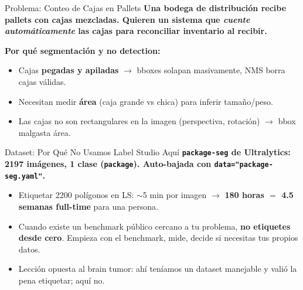 \documentclass[aspectratio=169, 11pt]{beamer}
\begin{document}
\begin{frame}[shrink]{Problema: Conteo de Cajas en Pallets}
  \vspace{6pt}
  {\footnotesize\color{arcaDark}\bfseries
    Una bodega de distribuci\'on recibe pallets con cajas mezcladas.
    Quieren un sistema que \emph{cuente autom\'aticamente} las cajas
    para reconciliar inventario al recibir.}

  \vspace{12pt}
  {\footnotesize\color{arcaDark}\bfseries Por qu\'e segmentaci\'on y no detection:}

  \vspace{8pt}
  {\footnotesize
  \begin{itemize}\setlength{\itemsep}{5pt}
    \item[{\color{arcaRed}\scriptsize\faArrowRight}]
      Cajas \textbf{pegadas y apiladas} $\to$ bboxes solapan masivamente,
      NMS borra cajas v\'alidas.
    \item[{\color{arcaRed}\scriptsize\faArrowRight}]
      Necesitan medir \textbf{\'area} (caja grande vs chica) para
      inferir tama\~no/peso.
    \item[{\color{arcaRed}\scriptsize\faArrowRight}]
      Las cajas no son rectangulares en la imagen (perspectiva,
      rotaci\'on) $\to$ bbox malgasta \'area.
  \end{itemize}
  }
\end{frame}

\begin{frame}[shrink]{Dataset: Por Qu\'e No Usamos Label Studio Aqu\'i}
  \vspace{8pt}
  {\footnotesize\color{arcaDark}\bfseries
    \texttt{package-seg} de Ultralytics: 2197 im\'agenes, 1 clase
    (\texttt{package}). Auto-bajada con \texttt{data="package-seg.yaml"}.}

  \vspace{12pt}
  {\footnotesize
  \begin{itemize}\setlength{\itemsep}{6pt}
    \item[{\color{arcaRed}\scriptsize\faArrowRight}]
      Etiquetar 2200 pol\'igonos en LS: $\sim$5 min por imagen
      $\to$ \textbf{180 horas $=$ 4.5 semanas full-time} para una persona.
    \item[{\color{arcaRed}\scriptsize\faArrowRight}]
      Cuando existe un benchmark p\'ublico cercano a tu problema,
      \textbf{no etiquetes desde cero}. Empieza con el benchmark,
      mide, decide si necesitas tus propios datos.
    \item[{\color{codeGreen}\scriptsize\faArrowRight}]
      Lecci\'on opuesta al brain tumor: ah\'i ten\'iamos un dataset
      manejable y vali\'o la pena etiquetar; aqu\'i no.
  \end{itemize}
  }
\end{frame}
\end{document}
